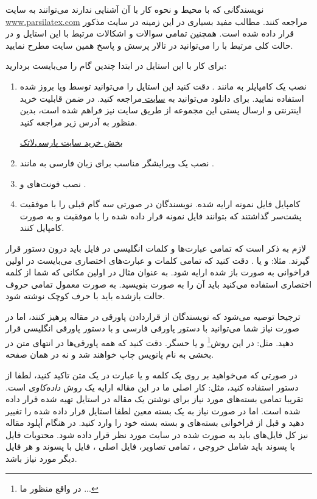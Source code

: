 \documentclass{CSICC2016}
\begin{document}
نویسندگانی که با محیط \lr{\LaTeX} و نحوه کار با آن آشنایی ندارند می‌توانند به سایت
\url{www.parsilatex.com}
مراجعه کنند. مطالب مفید بسیاری در این زمینه در سایت مذکور قرار داده شده است. همچنین تمامی سوالات و اشکالات مرتبط با این استایل  و در حالت کلی مرتبط با \lr{\LaTeX} را می‌توانید در تالار پرسش و پاسخ همین سایت مطرح نمایید.  

برای کار با این استایل در ابتدا چندین گام را می‌بایست بردارید:
\begin{enumerate} 
\item
نصب یک کامپایلر به مانند . دقت کنید این استایل را می‌توانید توسط
 ویا 
بروز شده استفاده نمایید. برای  دانلود  می‌توانید به
\href{www.tug.org/texlive/}{سایت }
مراجعه کنید. در ضمن قابلیت خرید اینترنتی و ارسال پستی این مجموعه از طریق سایت  نیز فراهم شده است، بدین منظور به آدرس زیر مراجعه کنید.

\href{http://parsilatex.com/site/product/%D9%85%D8%AC%D9%85%D9%88%D8%B9%D9%87-%D9%BE%D8%A7%D8%B1%D8%B3%DB%8C%E2%80%8C%D9%84%D8%A7%D8%AA%DA%A9/}{
بخش خرید سایت پارسی‌لاتک}


\item
نصب یک ویرایشگر مناسب برای زبان فارسی به مانند .
\item
نصب فونت‌های  و .
\item
کامپایل فایل نمونه ارایه شده. نویسندگان در صورتی سه گام قبلی را با موفقیت پشت‌سر گذاشتند که بتوانند فایل نمونه قرار داده شده را با موفقیت و به صورت  کامپایل کنند. 
\end{enumerate}
لازم به ذکر است که تمامی عبارت‌ها و کلمات انگلیسی در فایل \lr{\LaTeX} باید درون دستور  قرار گیرند. مثلا:
 و یا .
دقت کنید که تمامی کلمات و عبارت‌های اختصاری می‌بایست در اولین فراخوانی به صورت باز شده ارایه شود. به عنوان مثال در اولین مکانی که شما از کلمه اختصاری   استفاده می‌کنید باید آن را به صورت 
بنویسید. به صورت معمول تمامی حروف حالت بازشده باید با حرف کوچک نوشته شود.

ترجیحا توصیه می‌شود که نویسندگان از قراردادن پاورقی در مقاله پرهیز کنند، اما در صورت نیاز شما می‌توانید با دستور  پاورقی فارسی و با دستور  پاورقی انگلیسی قرار دهید. مثل: در این روش\footnote{در واقع منظور ما ...} و یا حسگر. دقت کنید که همه پاورقی‌ها در انتهای متن در بخشی به نام پانویس چاپ خواهند شد و نه در همان صفحه.

در صورتی که می‌خواهید بر روی یک کلمه و یا عبارت در یک متن تاکید کنید، لطفا از دستور  استفاده کنید، مثل: کار اصلی ما در این مقاله ارایه یک روش
\emph{داده‌کاوی}
است. تقریبا تمامی بسته‌های مورد نیاز برای نوشتن یک مقاله در استایل \lr{\LaTeX} تهیه شده قرار داده شده است. اما در صورت نیاز به یک بسته معین لطفا استایل قرار داده شده را تغییر دهید و قبل از فراخوانی بسته‌های  و بسته \lr{\XePersian} بسته خود را وارد کنید. در هنگام آپلود مقاله نیز کل فایل‌های \lr{\LaTeX} باید به صورت  شده در سایت مورد نظر قرار داده شود. محتویات فایل با پسوند  باید شامل خروجی ، تمامی تصاویر، فایل اصلی ، فایل با پسوند  و هر فایل دیگر مورد نیاز باشد.
\end{document}
